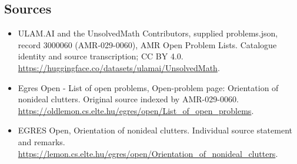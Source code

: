 \documentclass[11pt,a4paper]{article}
\begin{document}
\subsection{Sources}
\begin{itemize}
\item[S1] ULAM.AI and the UnsolvedMath Contributors, supplied problems.json, record 3000060 (AMR-029-0060), AMR Open Problem Lists. Catalogue identity and source transcription; CC BY 4.0.
\url{https://huggingface.co/datasets/ulamai/UnsolvedMath}.
\item[S2] Egres Open - List of open problems, Open-problem page: Orientation of nonideal clutters. Original source indexed by AMR-029-0060.
\url{https://oldlemon.cs.elte.hu/egres/open/List_of_open_problems}.
\item[S3] EGRES Open, Orientation of nonideal clutters. Individual source statement and remarks.
\url{https://lemon.cs.elte.hu/egres/open/Orientation_of_nonideal_clutters}.
\end{itemize}
\end{document}
